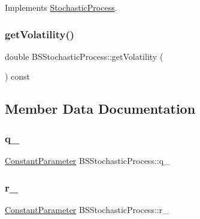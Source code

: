 Implements \hyperlink{class_stochastic_process_aad2ef51ca4bc2fe5f33a73e8f0ee361e}{Stochastic\+Process}.

\hypertarget{class_b_s_stochastic_process_ab63f363e94441ed0ee22ef10beea16a6}{}\label{class_b_s_stochastic_process_ab63f363e94441ed0ee22ef10beea16a6} 
\subsubsection{\texorpdfstring{get\+Volatility()}{getVolatility()}}
{\footnotesize\ttfamily double B\+S\+Stochastic\+Process\+::get\+Volatility (\begin{DoxyParamCaption}{ }\end{DoxyParamCaption}) const}



\subsection{Member Data Documentation}
\hypertarget{class_b_s_stochastic_process_ae7ca128da48604f063dce9ab91e8f861}{}\label{class_b_s_stochastic_process_ae7ca128da48604f063dce9ab91e8f861} 
\subsubsection{\texorpdfstring{q\+\_\+}{q\_}}
{\footnotesize\ttfamily \hyperlink{class_constant_parameter}{Constant\+Parameter} B\+S\+Stochastic\+Process\+::q\+\_\+\hspace{0.3cm}{\ttfamily [private]}}

\hypertarget{class_b_s_stochastic_process_a92dfcebbdbd50af90d401e899943c3bd}{}\label{class_b_s_stochastic_process_a92dfcebbdbd50af90d401e899943c3bd} 
\subsubsection{\texorpdfstring{r\+\_\+}{r\_}}
{\footnotesize\ttfamily \hyperlink{class_constant_parameter}{Constant\+Parameter} B\+S\+Stochastic\+Process\+::r\+\_\+\hspace{0.3cm}{\ttfamily [private]}}

